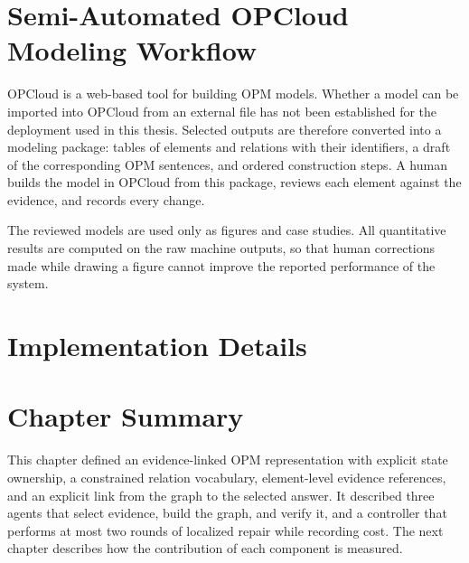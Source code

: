 \section{Semi-Automated OPCloud Modeling Workflow}
\label{sec:opcloud}

OPCloud is a web-based tool for building OPM models. Whether a model can be imported into OPCloud from an external file has not been established for the deployment used in this thesis. Selected outputs are therefore converted into a modeling package: tables of elements and relations with their identifiers, a draft of the corresponding OPM sentences, and ordered construction steps. A human builds the model in OPCloud from this package, reviews each element against the evidence, and records every change.

The reviewed models are used only as figures and case studies. All quantitative results are computed on the raw machine outputs, so that human corrections made while drawing a figure cannot improve the reported performance of the system.


\section{Implementation Details}
\label{sec:implementation}


\section{Chapter Summary}
\label{sec:ch4_summary}

This chapter defined an evidence-linked OPM representation with explicit state ownership, a constrained relation vocabulary, element-level evidence references, and an explicit link from the graph to the selected answer. It described three agents that select evidence, build the graph, and verify it, and a controller that performs at most two rounds of localized repair while recording cost. The next chapter describes how the contribution of each component is measured.

